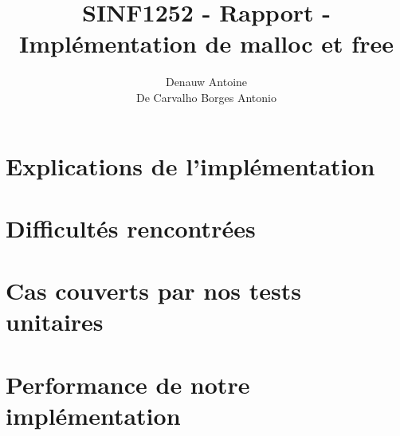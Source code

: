 \documentclass[10pt,a4paper]{article}
\begin{document}
\author{Denauw Antoine\\ De Carvalho Borges Antonio}
\title{SINF1252 - Rapport - Implémentation de malloc et free}
\maketitle

\tableofcontents


\newpage

\section{Explications de l'implémentation}




\section{Difficultés rencontrées}


\section{Cas couverts par nos tests unitaires}



\section{Performance de notre implémentation}

\end{document}

